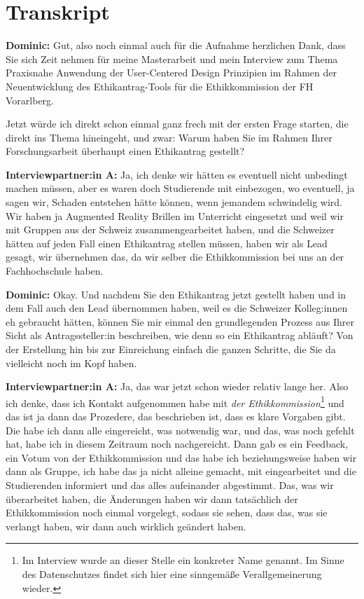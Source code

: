 \documentclass[a4paper,12pt,twoside]{scrreprt}
\begin{document}
\section{Transkript}
\label{appendix:interview-1-transkript}

\textbf{Dominic:} Gut, also noch einmal auch für die Aufnahme herzlichen Dank, dass Sie sich Zeit nehmen für meine Masterarbeit und mein Interview zum Thema Praxisnahe Anwendung der User-Centered Design Prinzipien im Rahmen der Neuentwicklung des Ethikantrag-Tools für die Ethikkommission der FH Vorarlberg.

Jetzt würde ich direkt schon einmal ganz frech mit der ersten Frage starten, die direkt ins Thema hineingeht, und zwar: Warum haben Sie im Rahmen Ihrer Forschungsarbeit überhaupt einen Ethikantrag gestellt?

\textbf{Interviewpartner:in A:} Ja, ich denke wir hätten es eventuell nicht unbedingt machen müssen, aber es waren doch Studierende mit einbezogen, wo eventuell, ja sagen wir, Schaden entstehen hätte können, wenn jemandem schwindelig wird. Wir haben ja Augmented Reality Brillen im Unterricht eingesetzt und weil wir mit Gruppen aus der Schweiz zusammengearbeitet haben, und die Schweizer hätten auf jeden Fall einen Ethikantrag stellen müssen, haben wir als Lead gesagt, wir übernehmen das, da wir selber die Ethikkommission bei uns an der Fachhochschule haben.

\textbf{Dominic:} Okay. Und nachdem Sie den Ethikantrag jetzt gestellt haben und in dem Fall auch den Lead übernommen haben, weil es die Schweizer Kolleg:innen eh gebraucht hätten, können Sie mir einmal den grundlegenden Prozess aus Ihrer Sicht als Antragssteller:in beschreiben, wie denn so ein Ethikantrag abläuft? Von der Erstellung hin bis zur Einreichung einfach die ganzen Schritte, die Sie da vielleicht noch im Kopf haben.

\textbf{Interviewpartner:in A:} Ja, das war jetzt schon wieder relativ lange her. Also ich denke, dass ich Kontakt aufgenommen habe mit \textit{der Ethikkommission}\footnote{Im Interview wurde an dieser Stelle ein konkreter Name genannt. Im Sinne des Datenschutzes findet sich hier eine sinngemäße Verallgemeinerung wieder.} und das ist ja dann das Prozedere, das beschrieben ist, dass es klare Vorgaben gibt. Die habe ich dann alle eingereicht, was notwendig war, und das, was noch gefehlt hat, habe ich in diesem Zeitraum noch nachgereicht. Dann gab es ein Feedback, ein Votum von der Ethikkommission und das habe ich beziehungsweise haben wir dann als Gruppe, ich habe das ja nicht alleine gemacht, mit eingearbeitet und die Studierenden informiert und das alles aufeinander abgestimmt. Das, was wir überarbeitet haben, die Änderungen haben wir dann tatsächlich der Ethikkommission noch einmal vorgelegt, sodass sie sehen, dass das, was sie verlangt haben, wir dann auch wirklich geändert haben.
\end{document}
